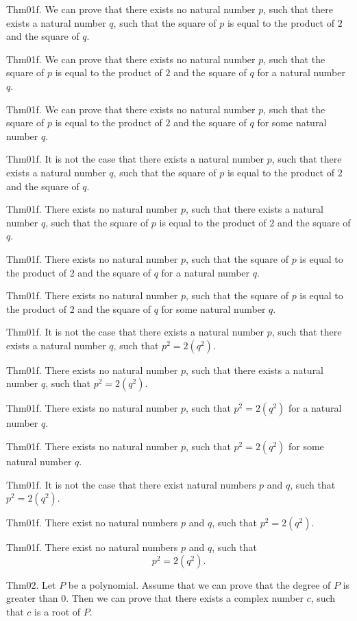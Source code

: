 \documentclass{article}
\begin{document}
Thm01f. We can prove that there exists no natural number $p$, such that there exists a natural number $q$, such that the square of $p$ is equal to the product of $2$ and the square of $q$.

Thm01f. We can prove that there exists no natural number $p$, such that the square of $p$ is equal to the product of $2$ and the square of $q$ for a natural number $q$.

Thm01f. We can prove that there exists no natural number $p$, such that the square of $p$ is equal to the product of $2$ and the square of $q$ for some natural number $q$.

Thm01f. It is not the case that there exists a natural number $p$, such that there exists a natural number $q$, such that the square of $p$ is equal to the product of $2$ and the square of $q$.

Thm01f. There exists no natural number $p$, such that there exists a natural number $q$, such that the square of $p$ is equal to the product of $2$ and the square of $q$.

Thm01f. There exists no natural number $p$, such that the square of $p$ is equal to the product of $2$ and the square of $q$ for a natural number $q$.

Thm01f. There exists no natural number $p$, such that the square of $p$ is equal to the product of $2$ and the square of $q$ for some natural number $q$.

Thm01f. It is not the case that there exists a natural number $p$, such that there exists a natural number $q$, such that $p ^{ 2}= 2 (q ^{ 2})$.

Thm01f. There exists no natural number $p$, such that there exists a natural number $q$, such that $p ^{ 2}= 2 (q ^{ 2})$.

Thm01f. There exists no natural number $p$, such that $p ^{ 2}= 2 (q ^{ 2})$ for a natural number $q$.

Thm01f. There exists no natural number $p$, such that $p ^{ 2}= 2 (q ^{ 2})$ for some natural number $q$.

Thm01f. It is not the case that there exist natural numbers $p$ and $q$, such that $p ^{ 2}= 2 (q ^{ 2})$.

Thm01f. There exist no natural numbers $p$ and $q$, such that $p ^{ 2}= 2 (q ^{ 2})$.

Thm01f. There exist no natural numbers $p$ and $q$, such that $$p ^{ 2}= 2 (q ^{ 2}).$$

Thm02. Let $P$ be a polynomial. Assume that we can prove that the degree of $P$ is greater than $0$. Then we can prove that there exists a complex number $c$, such that $c$ is a root of $P$.
\end{document}
